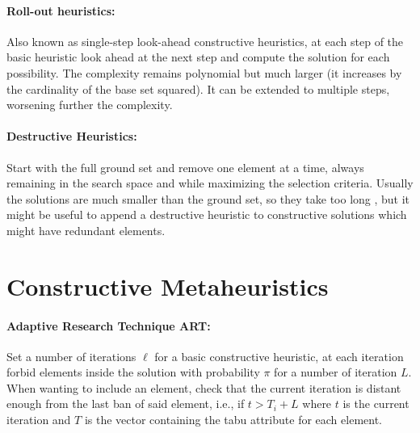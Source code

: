\documentclass{article}
\begin{document}
	\paragraph{Roll-out heuristics:} Also known as single-step look-ahead constructive heuristics, at each step of the basic heuristic look ahead at the next step and compute the solution for each possibility. The complexity remains polynomial but much larger (it increases by the cardinality of the base set squared). It can be extended to multiple steps, worsening further the complexity.\\
	
	\paragraph{Destructive Heuristics:} Start with the full ground set and remove one element at a time, always remaining in the search space and while maximizing the selection criteria. Usually the solutions are much smaller than the ground set, so they take too long , but it might be useful to append a destructive heuristic to constructive solutions which might have redundant elements.\\
	
	\section*{Constructive Metaheuristics}
	
	\paragraph{Adaptive Research Technique ART:} Set a number of iterations $\ell$ for a basic constructive heuristic, at each iteration forbid elements inside the solution with probability $\pi$ for a number of iteration $L$. When wanting to include an element, check that the current iteration is distant enough from the last ban of said element, i.e., if $t > T_i + L$ where $t$ is the current iteration and $T$ is the vector containing the tabu attribute for each element.\\
	
\end{document}

